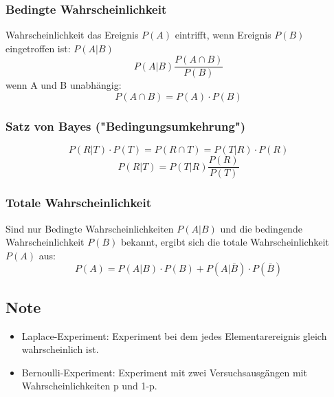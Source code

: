 \documentclass[margin=normal]{tex/hsrzf}
\begin{document}
\begin{multicols}{2}

    \subsubsection{Bedingte Wahrscheinlichkeit}
    Wahrscheinlichkeit das Ereignis $P(A)$ eintrifft,
    wenn Ereignis $P(B)$ eingetroffen ist: $P(A|B)$
    $$P(A|B)\frac{P(A\cap B)}{P(B)}$$
    wenn A und B unabhängig:
    $$P(A \cap B) = P(A) \cdot P(B)$$
    \subsubsection*{Satz von Bayes ("Bedingungsumkehrung")}
    $$P(R|T) \cdot P(T) = P(R \cap T) = P(T|R) \cdot P(R)$$
    $$P(R|T) = P(T|R) \frac{P(R)}{P(T)}$$
    \subsubsection{Totale Wahrscheinlichkeit}
    Sind nur Bedingte Wahrscheinlichkeiten $P(A|B)$ und die bedingende Wahrscheinlichkeit
    $P(B)$ bekannt, ergibt sich die totale Wahrscheinlichkeit $P(A)$ aus:
    $$P(A) = P(A|B) \cdot P(B) + P(A|\bar{B})\cdot P(\bar{B})$$
    \subsection*{Note}
    \begin{itemize}
        \item Laplace-Experiment: Experiment bei dem jedes Elementarereignis gleich wahrscheinlich ist.
        \item Bernoulli-Experiment: Experiment mit zwei Versuchsausgängen mit Wahrscheinlichkeiten p und 1-p.
    \end{itemize}
\end{multicols}
\end{document}
